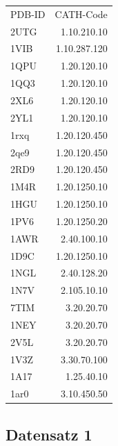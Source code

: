 \documentclass{report}
\begin{document}
\begin{tabular}{l r}

PDB-ID & CATH-Code  \\
2UTG & 1.10.210.10  \\ %
1VIB & 1.10.287.120 \\ %
1QPU & 1.20.120.10  \\ %
1QQ3 & 1.20.120.10  \\ %
2XL6 & 1.20.120.10  \\ %
2YL1 & 1.20.120.10  \\ %
1rxq & 1.20.120.450 \\ %
2qe9 & 1.20.120.450 \\ %
2RD9 & 1.20.120.450 \\ %
1M4R & 1.20.1250.10 \\ %
1HGU & 1.20.1250.10 \\ %
1PV6 & 1.20.1250.20 \\ %
1AWR & 2.40.100.10  \\ %
1D9C & 1.20.1250.10 \\ %
1NGL & 2.40.128.20  \\ %
1N7V & 2.105.10.10  \\ %
7TIM & 3.20.20.70   \\ %
1NEY & 3.20.20.70   \\ %
2V5L & 3.20.20.70   \\ %
1V3Z & 3.30.70.100  \\ %
1A17 & 1.25.40.10   \\ %
1ar0 & 3.10.450.50  \\ %

\end{tabular}


\subsection{Datensatz 1} 
\end{document}

